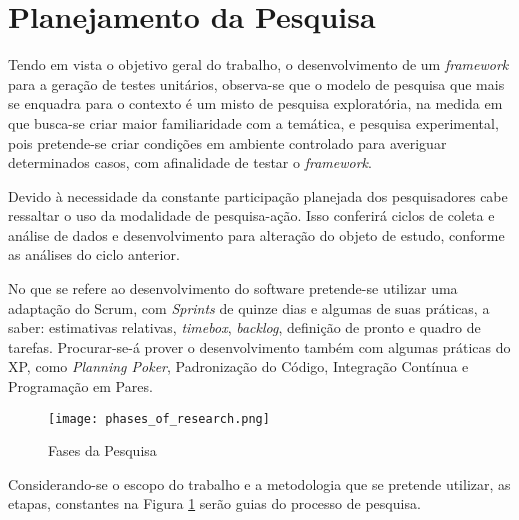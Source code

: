   \section{Planejamento da Pesquisa}
  Tendo em vista o objetivo geral do trabalho, o desenvolvimento de um \textit{framework} para a geração de testes unitários, observa-se que o modelo de pesquisa que mais se enquadra para o contexto é um misto de pesquisa exploratória, na medida em que busca-se criar maior familiaridade com a temática, e pesquisa experimental, pois pretende-se criar condições em ambiente controlado para averiguar determinados casos, com afinalidade de testar o \textit{framework}.
  \par
  \indent Devido à necessidade da constante participação planejada dos pesquisadores cabe ressaltar o uso da modalidade de pesquisa-ação. Isso conferirá ciclos de coleta e análise de dados e desenvolvimento para alteração do objeto de estudo, conforme as análises do ciclo anterior.
  \par
  \indent No que se refere ao desenvolvimento do software pretende-se utilizar uma adaptação do Scrum, com \textit{Sprints} de quinze dias e algumas de suas práticas, a saber: estimativas relativas, \textit{timebox}, \textit{backlog}, definição de pronto e quadro de tarefas. Procurar-se-á prover o desenvolvimento também com algumas práticas do XP, como \textit{Planning Poker}, Padronização do Código, Integração Contínua e Programação em Pares.
  \newpage
  \begin{figure}[h]
    \centering
    \texttt{[image: phases\_of\_research.png]}
    \caption{Fases da Pesquisa}
    \label{fig:phases_of_research}
  \end{figure}
  \indent Considerando-se o escopo do trabalho e a metodologia que se pretende utilizar, as etapas, constantes na Figura \ref{fig:phases_of_research} serão guias do processo de pesquisa.
